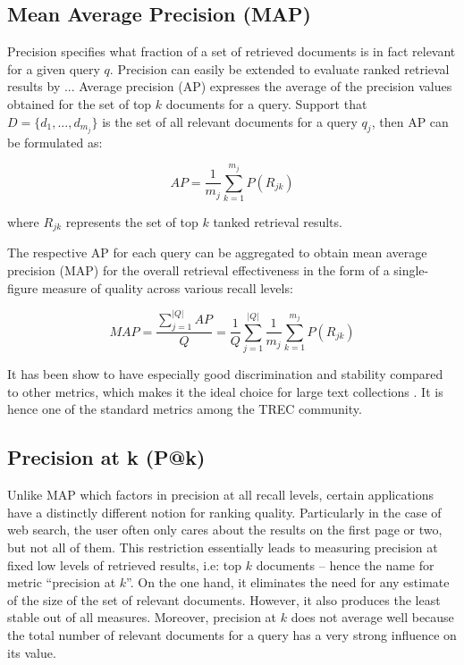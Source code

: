 \subsection{Mean Average Precision (MAP)}

Precision specifies what fraction of a set of retrieved documents is in fact relevant for a given query $ q $.
Precision can easily be extended to evaluate ranked retrieval results by ...
Average precision (AP) expresses the average of the precision values obtained for the set of top $ k $ documents for a query.
Support that $ D = \{d_1, ..., d_{m_j}\} $ is the set of all relevant documents for a query $ q_j $, then AP can be formulated as:

\begin{equation}
AP = \frac{1}{m_j} \sum^{m_j} _{k = 1} P(R_{jk})
\end{equation}

where $ R_{jk} $ represents the set of top $ k $ tanked retrieval results.

The respective AP for each query can be aggregated to obtain mean average precision (MAP) for the overall retrieval effectiveness in the form of a single-figure measure of quality across various recall levels:

\begin{equation}
MAP = \frac{\sum^{|Q|} _{j = 1} AP}{Q} = \frac{1}{Q} \sum^{|Q|} _{j = 1} \frac{1}{m_j} \sum^{m_j} _{k = 1} P(R_{jk})
\end{equation}


It has been show to have especially good discrimination and stability compared to other metrics, which makes it the ideal choice for large text collections \cite{manning2010introduction}.
It is hence one of the standard metrics among the TREC community.

\subsection{Precision at k (P@k)}

Unlike MAP which factors in precision at all recall levels, certain applications have a distinctly different notion for ranking quality.
Particularly in the case of web search, the user often only cares about the results on the first page or two, but not all of them.
This restriction essentially leads to measuring precision at fixed low levels of retrieved results, i.e: top $ k $ documents -- hence the name for metric ``precision at $ k $''.
On the one hand, it eliminates the need for any estimate of the size of the set of relevant documents.
However, it also produces the least stable out of all measures.
Moreover, precision at $ k $ does not average well because the total number of relevant documents for a query has a very strong influence on its value. 


